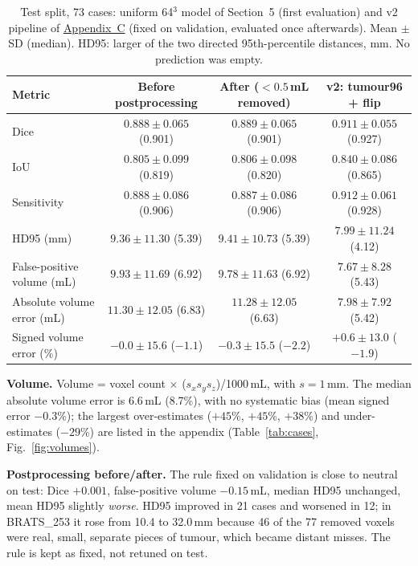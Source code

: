 \documentclass[10pt,a4paper]{article}
\newcommand{\mL}{\,mL}
\newcommand{\mm}{\,mm}
\begin{document}
\begin{table}[H]
\centering\small
\caption{Test split, 73 cases: uniform 64$^3$ model of Section~5 (first evaluation) and v2 pipeline of \hyperref[sec:v2]{Appendix~C} (fixed on validation, evaluated once afterwards). Mean $\pm$ SD (median). HD95: larger of the two directed 95th-percentile distances, mm. No prediction was empty.}
\label{tab:test}
\begin{tabular}{@{}lccc@{}}\toprule
Metric & Before postprocessing & After ($<0.5$\mL{} removed) & v2: tumour96 + flip \\\midrule
Dice & $0.888\pm0.065$ (0.901) & $\mathbf{0.889\pm0.065}$ (0.901) & $\mathbf{0.911\pm0.055}$ (0.927) \\
IoU & $0.805\pm0.099$ (0.819) & $0.806\pm0.098$ (0.820) & $0.840\pm0.086$ (0.865) \\
Sensitivity & $0.888\pm0.086$ (0.906) & $0.887\pm0.086$ (0.906) & $0.912\pm0.061$ (0.928) \\
HD95 (mm) & $9.36\pm11.30$ (5.39) & $9.41\pm10.73$ (5.39) & $7.99\pm11.24$ (4.12) \\
False-positive volume (mL) & $9.93\pm11.69$ (6.92) & $9.78\pm11.63$ (6.92) & $7.67\pm8.28$ (5.43) \\
Absolute volume error (mL) & $11.30\pm12.05$ (6.83) & $11.28\pm12.05$ (6.63) & $7.98\pm7.92$ (5.42) \\
Signed volume error (\%) & $-0.0\pm15.6$ ($-1.1$) & $-0.3\pm15.5$ ($-2.2$) & $+0.6\pm13.0$ ($-1.9$) \\\bottomrule
\end{tabular}
\end{table}

\textbf{Volume.} Volume = voxel count $\times$ ($s_x s_y s_z$)/1000\mL{}, with $s=1$\mm. The median absolute volume error is 6.6\mL{} (8.7\%), with no systematic bias (mean signed error $-0.3$\%); the largest over-estimates ($+45$\%, $+45$\%, $+38$\%) and under-estimates ($-29$\%) are listed in the appendix (Table~\ref{tab:cases}, Fig.~\ref{fig:volumes}).

\textbf{Postprocessing before/after.} The rule fixed on validation is close to neutral on test: Dice $+0.001$, false-positive volume $-0.15$\mL, median HD95 unchanged, mean HD95 slightly \emph{worse}. HD95 improved in 21 cases and worsened in 12; in BRATS\_253 it rose from 10.4 to 32.0\mm{} because 46 of the 77 removed voxels were real, small, separate pieces of tumour, which became distant misses. The rule is kept as fixed, not retuned on test.
\end{document}
